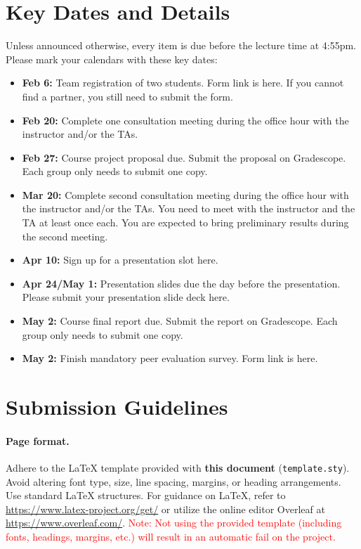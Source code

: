 \documentclass{article}
\begin{document}
\section{Key Dates and Details}
Unless announced otherwise, every item is due before the lecture time at 4:55pm. Please mark your calendars with these key dates:
\begin{itemize}
\item \textbf{Feb 6:} Team registration of two students. Form link is here. If you cannot find a partner, you still need to submit the form.
\item \textbf{Feb 20:} Complete one consultation meeting during the office hour with the instructor and/or the TAs. 
\item \textbf{Feb 27:} Course project proposal due. Submit the proposal on Gradescope. Each group only needs to submit one copy.
\item \textbf{Mar 20:} Complete second consultation meeting during the office hour with the instructor and/or the TAs. You need to meet with the instructor and the TA at least once each. You are expected to bring preliminary results during the second meeting.
\item \textbf{Apr 10:} Sign up for a presentation slot here.
\item \textbf{Apr 24/May 1:} Presentation slides due the day before the presentation. Please submit your presentation slide deck here.
\item \textbf{May 2:} Course final report due. Submit the report on Gradescope. Each group only needs to submit one copy.
\item \textbf{May 2:} Finish mandatory peer evaluation survey. Form link is here.
\end{itemize}

\section{Submission Guidelines}
\paragraph{Page format.} Adhere to the LaTeX template provided with \textbf{this document} (\texttt{template.sty}). Avoid altering font type, size, line spacing, margins, or heading arrangements. Use standard LaTeX structures. For guidance on LaTeX, refer to \url{https://www.latex-project.org/get/} or utilize the online editor Overleaf at \url{https://www.overleaf.com/}. \textcolor{red}{Note: Not using the provided template (including fonts, headings, margins, etc.) will result in an automatic fail on the project.}
\end{document}
